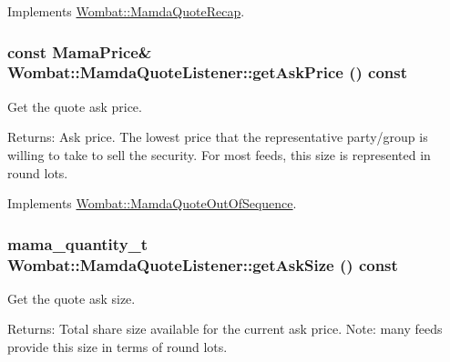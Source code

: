 Implements \hyperlink{classWombat_1_1MamdaQuoteRecap_8ee3dce6e5aab4ef5219e3bacb98798d}{Wombat::Mamda\-Quote\-Recap}.\hypertarget{classWombat_1_1MamdaQuoteListener_b4c49376d3d07db48065adc6d74da196}{
\subsubsection[getAskPrice]{\setlength{\rightskip}{0pt plus 5cm}const Mama\-Price\& Wombat::Mamda\-Quote\-Listener::get\-Ask\-Price () const}}
\label{classWombat_1_1MamdaQuoteListener_b4c49376d3d07db48065adc6d74da196}


Get the quote ask price. 

\begin{Desc}
\item[Returns:]Ask price. The lowest price that the representative party/group is willing to take to sell the security. For most feeds, this size is represented in round lots. \end{Desc}


Implements \hyperlink{classWombat_1_1MamdaQuoteOutOfSequence_59c673bb5940ecc1b3096a7e523eaf2f}{Wombat::Mamda\-Quote\-Out\-Of\-Sequence}.\hypertarget{classWombat_1_1MamdaQuoteListener_4808439461507148c55e678a3dffbb5d}{
\subsubsection[getAskSize]{\setlength{\rightskip}{0pt plus 5cm}mama\_\-quantity\_\-t Wombat::Mamda\-Quote\-Listener::get\-Ask\-Size () const}}
\label{classWombat_1_1MamdaQuoteListener_4808439461507148c55e678a3dffbb5d}


Get the quote ask size. 

\begin{Desc}
\item[Returns:]Total share size available for the current ask price. Note: many feeds provide this size in terms of round lots. \end{Desc}


